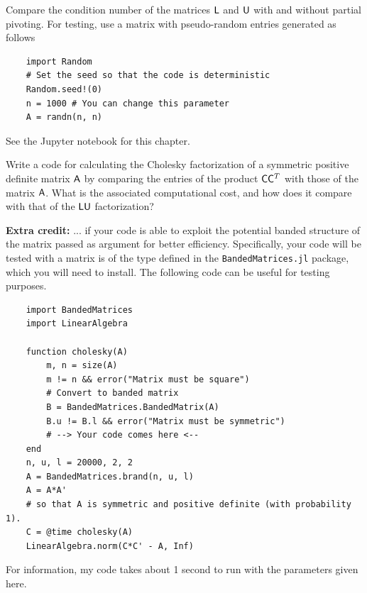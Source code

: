 \begin{compexercise}
    \label{exercise:linear_lu_with_partial_pivoting}
    Compare the condition number of the matrices $\mathsf L$ and $\mathsf U$ with and without partial pivoting.
    For testing, use a matrix with pseudo-random entries generated as follows
    \begin{verbatim}
    import Random
    # Set the seed so that the code is deterministic
    Random.seed!(0)
    n = 1000 # You can change this parameter
    A = randn(n, n)
    \end{verbatim}
\end{compexercise}
\begin{solution}
    See the Jupyter notebook for this chapter.
\end{solution}

\begin{compexercise}
    \label{exercise:linear_cholesky}
    Write a code for calculating the Cholesky factorization of a symmetric positive definite matrix $\mathsf A$ by comparing the entries of the product $\mathsf C \mathsf C^T$ with those of the matrix $\mathsf A$.
    What is the associated computational cost,
    and how does it compare with that of the $\mathsf L \mathsf U$ factorization?

    \noindent \textbf{Extra credit:} ... if your code is able to exploit the potential banded structure of the matrix passed as argument for better efficiency.
    Specifically, your code will be tested with a matrix is of the type  defined in the \texttt{BandedMatrices.jl} package,
    which you will need to install.
    The following code can be useful for testing purposes.
    \begin{verbatim}
    import BandedMatrices
    import LinearAlgebra

    function cholesky(A)
        m, n = size(A)
        m != n && error("Matrix must be square")
        # Convert to banded matrix
        B = BandedMatrices.BandedMatrix(A)
        B.u != B.l && error("Matrix must be symmetric")
        # --> Your code comes here <--
    end
    n, u, l = 20000, 2, 2
    A = BandedMatrices.brand(n, u, l)
    A = A*A'
    # so that A is symmetric and positive definite (with probability 1).
    C = @time cholesky(A)
    LinearAlgebra.norm(C*C' - A, Inf)
    \end{verbatim}
    For information, my code takes about 1 second to run with the parameters given here.
\end{compexercise}

